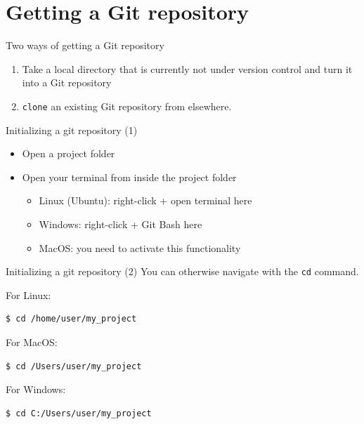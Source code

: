 \documentclass[handout]{beamer}
\begin{document}

\section{Getting a Git repository}

\begin{frame}{Two ways of getting a Git repository}
	\begin{enumerate}
		\item Take a local directory that is currently not under version control and turn it into a Git repository
		\item \texttt{clone} an existing Git repository from elsewhere.
	\end{enumerate}
\end{frame}

\begin{frame}{Initializing a git repository (1)}
	\begin{itemize}
		\item Open a project folder
		\item Open your terminal from inside the project folder
		\begin{itemize}
			\item Linux (Ubuntu): right-click + open terminal here
			\item Windows: right-click + Git Bash here
			\item MacOS: you need to activate this functionality
    \end{itemize}
  \end{itemize}
\end{frame}

\begin{frame}[fragile]{Initializing a git repository (2)}
You can otherwise navigate with the \texttt{cd} command.

\vspace{0.5cm}

For Linux:
\begin{lstlisting}
$ cd /home/user/my_project
\end{lstlisting}

For MacOS:
\begin{lstlisting}
$ cd /Users/user/my_project
\end{lstlisting}

For Windows:
\begin{lstlisting}
$ cd C:/Users/user/my_project
\end{lstlisting}

\end{frame}
\end{document}
